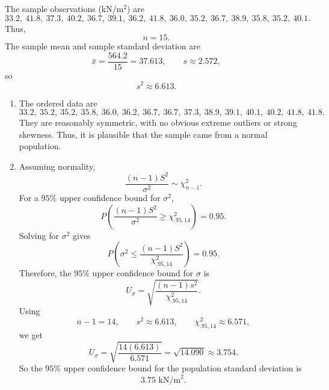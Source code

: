 \documentclass[11pt]{article}
\begin{document}
The sample observations (kN/m$^2$) are
\[
33.2,\ 41.8,\ 37.3,\ 40.2,\ 36.7,\ 39.1,\ 36.2,\ 41.8,\ 36.0,\ 35.2,\ 36.7,\ 38.9,\ 35.8,\ 35.2,\ 40.1.
\]
Thus,
\[
n=15.
\]
The sample mean and sample standard deviation are
\[
\bar{x}=\frac{564.2}{15}=37.613, \qquad s\approx 2.572,
\]
so
\[
s^2\approx 6.613.
\]

\begin{enumerate}
\item[(a)] The ordered data are
\[
33.2,\ 35.2,\ 35.2,\ 35.8,\ 36.0,\ 36.2,\ 36.7,\ 36.7,\ 37.3,\ 38.9,\ 39.1,\ 40.1,\ 40.2,\ 41.8,\ 41.8.
\]
They are reasonably symmetric, with no obvious extreme outliers or strong skewness. Thus, it is plausible that the sample came from a normal population.

\item[(b)] Assuming normality,
\[
\frac{(n-1)S^2}{\sigma^2}\sim \chi^2_{n-1}.
\]
For a $95\%$ upper confidence bound for $\sigma^2$,
\[
P\left(\frac{(n-1)S^2}{\sigma^2}\ge \chi^2_{.95,14}\right)=0.95.
\]
Solving for $\sigma^2$ gives
\[
P\left(\sigma^2\le \frac{(n-1)S^2}{\chi^2_{.95,14}}\right)=0.95.
\]
Therefore, the $95\%$ upper confidence bound for $\sigma$ is
\[
U_{\sigma}=\sqrt{\frac{(n-1)s^2}{\chi^2_{.95,14}}}.
\]
Using
\[
n-1=14, \qquad s^2\approx 6.613, \qquad \chi^2_{.95,14}\approx 6.571,
\]
we get
\[
U_{\sigma}=\sqrt{\frac{14(6.613)}{6.571}}=\sqrt{14.090}\approx 3.754.
\]
So the $95\%$ upper confidence bound for the population standard deviation is
\[
3.75\text{ kN/m}^2.
\]
\end{enumerate}
\end{document}
